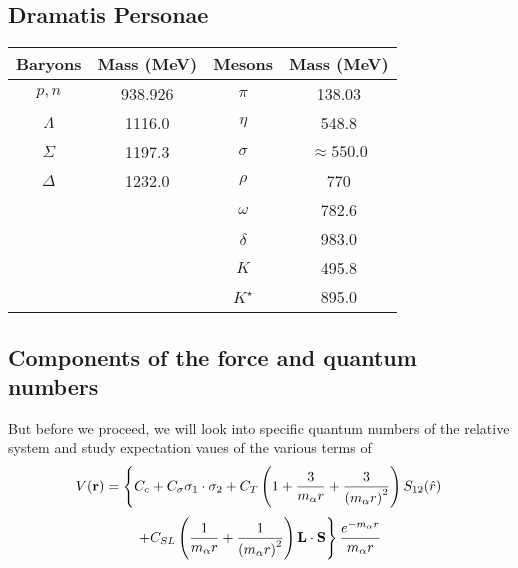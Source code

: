 \documentclass[%
twoside,                 %
final,                   %
10pt]{article}
\begin{document}
\subsection{Dramatis Personae}
\begin{block}{}


{\footnotesize
\begin{tabular}{cccc}
\hline
\multicolumn{1}{c}{ Baryons } & \multicolumn{1}{c}{ Mass (MeV) } & \multicolumn{1}{c}{ Mesons } & \multicolumn{1}{c}{ Mass (MeV) } \\
\hline
$p,n$     & 938.926    & $\pi$       & 138.03          \\
$\Lambda$ & 1116.0     & $\eta$      & 548.8           \\
$\Sigma$  & 1197.3     & $\sigma$    & $\approx 550.0$ \\
$\Delta$  & 1232.0     & $\rho$      & 770             \\
          &            & $\omega$    & 782.6           \\
          &            & $\delta$    & 983.0           \\
          &            & $K$         & 495.8           \\
          &            & $K^{\star}$ & 895.0           \\
\hline
\end{tabular}
}

\noindent
\end{block}


\subsection{Components of the force and quantum numbers}
\begin{block}{}
But before we proceed, we will look into specific quantum numbers of the relative system and study 
expectation vaues of the various terms of
\[
V(\mathbf{r})= \left\{ C_c + C_\mathbf{\sigma} \mathbf{\sigma}_1\cdot\mathbf{\sigma}_2
 + C_T \left( 1 + {3\over m_\alpha r} + {3\over
\left(m_\alpha r\right)^2}\right) S_{12} (\hat r)\right. 
\]
\[
\left. + C_{SL} \left( {1\over m_\alpha r} + {1\over \left( m_\alpha r\right)^2}
\right) \mathbf{L}\cdot \mathbf{S}
\right\} \frac{e^{-m_\alpha r}}{m_\alpha r}
\]
\end{block}

\end{document}
